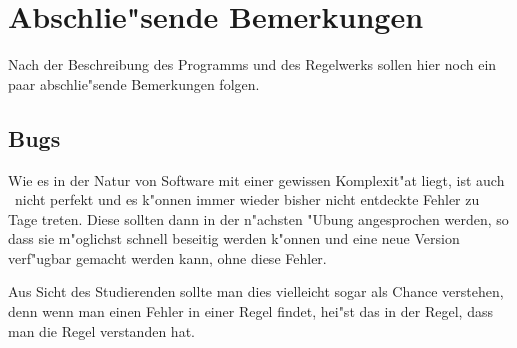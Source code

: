 
\chapter{Abschlie"sende Bemerkungen}

Nach der Beschreibung des Programms und des Regelwerks sollen hier noch ein paar abschlie"sende
Bemerkungen folgen.



\section{Bugs}

Wie es in der Natur von Software mit einer gewissen Komplexit"at liegt, ist auch \TPML\ nicht
perfekt und es k"onnen immer wieder bisher nicht entdeckte Fehler zu Tage treten. Diese sollten
dann in der n"achsten "Ubung angesprochen werden, so dass sie m"oglichst schnell beseitig
werden k"onnen und eine neue Version verf"ugbar gemacht werden kann, ohne diese Fehler.

Aus Sicht des Studierenden sollte man dies vielleicht sogar als Chance verstehen, denn wenn
man einen Fehler in einer Regel findet, hei"st das in der Regel, dass man die Regel verstanden
hat.



